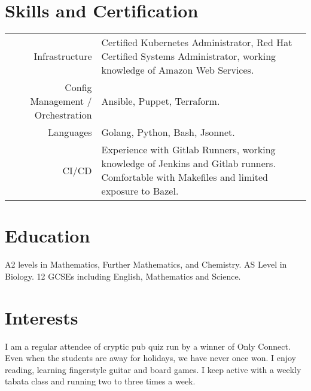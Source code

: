 \documentclass{cv}
\begin{document}
\section{Skills and Certification}
\renewcommand{\arraystretch}{1.5}
%
\begin{tabularx}{\textwidth}{ r|L }
  Infrastructure & Certified Kubernetes Administrator, Red Hat Certified Systems Administrator, working knowledge of Amazon Web Services. \\
  Config Management / Orchestration & Ansible, Puppet, Terraform. \\
  Languages & Golang, Python, Bash, Jsonnet. \\
  CI/CD & Experience with Gitlab Runners, working knowledge of Jenkins and Gitlab runners. Comfortable with Makefiles and limited exposure to Bazel. \\
\end{tabularx}

\section{Education}
A2 levels in Mathematics, Further Mathematics, and Chemistry. AS Level in Biology. 12 GCSEs including English, Mathematics and Science.

\section{Interests}
I am a regular attendee of cryptic pub quiz run by a winner of Only Connect. Even when the students are away for holidays, we have never once won. I enjoy reading, learning fingerstyle guitar and board games. I keep active with a weekly tabata class and running two to three times a week.
\end{document}
